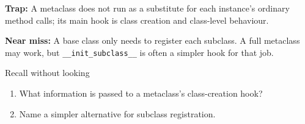 \documentclass[11pt]{article}
\begin{document}
\begin{keepsection}
\begin{notebox}\textbf{Trap:} A metaclass does not run as a substitute for each instance’s ordinary method calls; its main hook is class creation and class-level behaviour.\end{notebox}

\begin{notebox}\textbf{Near miss:} A base class only needs to register each subclass. A full metaclass may work, but \texttt{\_\_init\_subclass\_\_} is often a simpler hook for that job.\end{notebox}

\begin{recallbox}{Recall without looking}
\begin{enumerate}
\item What information is passed to a metaclass’s class-creation hook?
\item Name a simpler alternative for subclass registration.
\end{enumerate}

\end{recallbox}
\end{keepsection}
\end{document}
